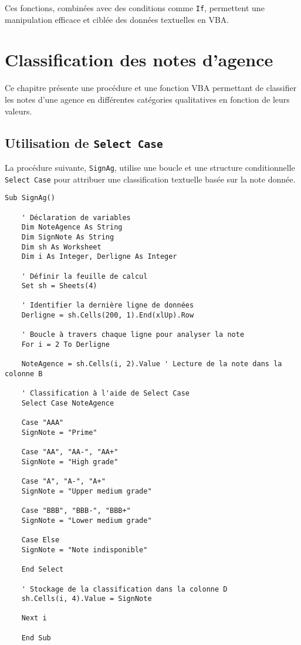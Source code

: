 \documentclass[a4paper,12pt]{report}
\begin{document}
Ces fonctions, combinées avec des conditions comme \texttt{If}, permettent une manipulation efficace et ciblée des données textuelles en VBA.

\chapter{Classification des notes d'agence}

Ce chapitre présente une procédure et une fonction VBA permettant de classifier les notes d'une agence en différentes catégories qualitatives en fonction de leurs valeurs.

\section{Utilisation de \texttt{Select Case}}

La procédure suivante, \texttt{SignAg}, utilise une boucle et une structure conditionnelle \texttt{Select Case} pour attribuer une classification textuelle basée sur la note donnée.

\begin{lstlisting}[language=vbscript, caption={Procédure \texttt{SignAg}}]
	Sub SignAg()
	
	' Déclaration de variables
	Dim NoteAgence As String
	Dim SignNote As String
	Dim sh As Worksheet
	Dim i As Integer, Derligne As Integer
	
	' Définir la feuille de calcul
	Set sh = Sheets(4)
	
	' Identifier la dernière ligne de données
	Derligne = sh.Cells(200, 1).End(xlUp).Row
	
	' Boucle à travers chaque ligne pour analyser la note
	For i = 2 To Derligne
	
	NoteAgence = sh.Cells(i, 2).Value ' Lecture de la note dans la colonne B
	
	' Classification à l'aide de Select Case
	Select Case NoteAgence
	
	Case "AAA"
	SignNote = "Prime"
	
	Case "AA", "AA-", "AA+"
	SignNote = "High grade"
	
	Case "A", "A-", "A+"
	SignNote = "Upper medium grade"
	
	Case "BBB", "BBB-", "BBB+"
	SignNote = "Lower medium grade"
	
	Case Else
	SignNote = "Note indisponible"
	
	End Select
	
	' Stockage de la classification dans la colonne D
	sh.Cells(i, 4).Value = SignNote
	
	Next i
	
	End Sub
\end{lstlisting}
\end{document}
